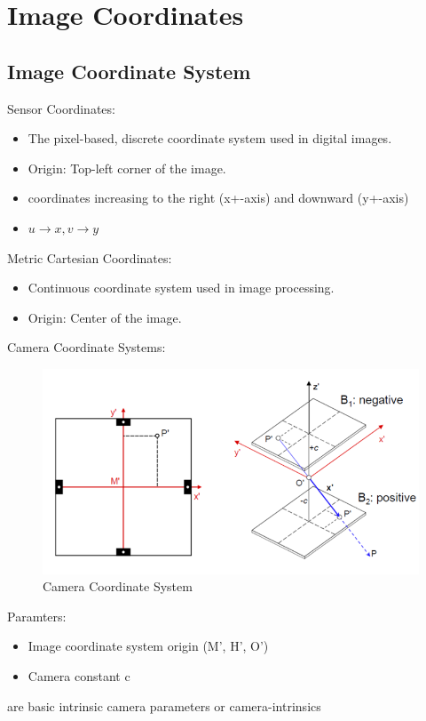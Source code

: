 \section{Image Coordinates}
\subsection{Image Coordinate System}
Sensor Coordinates:
\begin{itemize}
    \item The pixel-based, discrete coordinate system used in digital images.
    \item Origin: Top-left corner of the image.
    \item coordinates increasing to the right (x+-axis) and downward (y+-axis)
    \item \(u \rightarrow x, v \rightarrow y\)
\end{itemize}
Metric Cartesian Coordinates:
\begin{itemize}
    \item Continuous coordinate system used in image processing.
    \item Origin: Center of the image.
\end{itemize}

Camera Coordinate Systems:
\begin{figure}[ht]
    \centering
    \includegraphics[width = \columnwidth]{Images/08/CameraCoordinateSystems.png}
    \caption{Camera Coordinate System}
    \label{fig:camera_coordinate_system}
\end{figure}
Paramters:
\begin{itemize}
    \item Image coordinate system origin (M', H', O')
    \item Camera constant c
\end{itemize}
are basic intrinsic camera parameters or
camera-intrinsics
